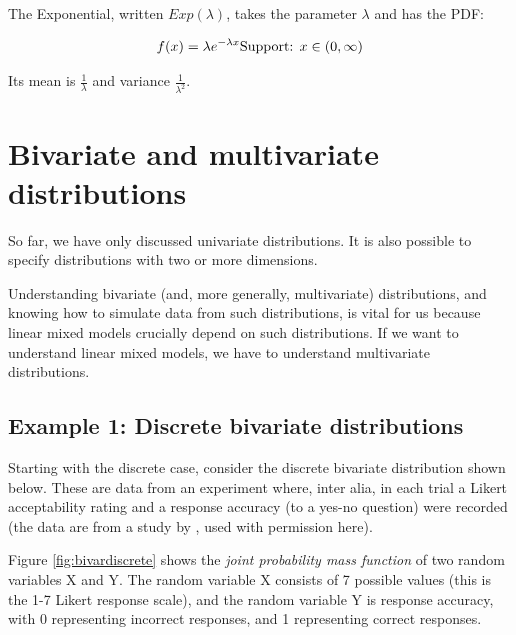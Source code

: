 \documentclass[12pt,]{krantz}
\begin{document}
The Exponential, written \(Exp(\lambda)\), takes the parameter \(\lambda\) and has the PDF:

\begin{equation}
f(x) = \lambda e^{-\lambda x} \hbox{Support: } x \in (0, \infty)
\end{equation}

Its mean is \(\frac{1}{\lambda}\) and variance \(\frac{1}{\lambda^2}\).

\hypertarget{bivariate-and-multivariate-distributions}{%
\section{Bivariate and multivariate distributions}\label{bivariate-and-multivariate-distributions}}

So far, we have only discussed univariate distributions. It is also possible to specify distributions with two or more dimensions.

Understanding bivariate (and, more generally, multivariate) distributions, and knowing how to simulate data from such distributions, is vital for us because linear mixed models crucially depend on such distributions. If we want to understand linear mixed models, we have to understand multivariate distributions.

\hypertarget{example-1-discrete-bivariate-distributions}{%
\subsection{Example 1: Discrete bivariate distributions}\label{example-1-discrete-bivariate-distributions}}

Starting with the discrete case, consider the discrete bivariate distribution shown below. These are data from an experiment where, inter alia, in each trial a Likert acceptability rating and a response accuracy (to a yes-no question) were recorded (the data are from a study by \citet{AnnaLphd}, used with permission here).

Figure \ref{fig:bivardiscrete} shows the \emph{joint probability mass function} of two random variables X and Y. The random variable X consists of 7 possible values (this is the 1-7 Likert response scale), and the random variable Y is response accuracy, with 0 representing incorrect responses, and 1 representing correct responses.
\end{document}
